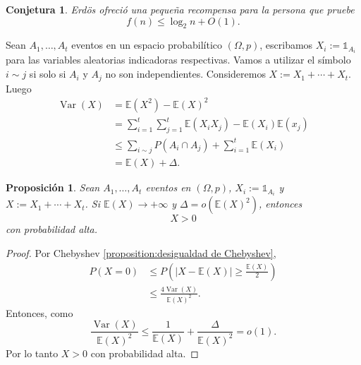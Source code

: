 \documentclass[12pt]{report}
\theoremstyle{plain}
\newtheorem{proposition}[theorem]{Proposición}
\newtheorem{conjecture}[theorem]{Conjetura}
\theoremstyle{definition}
\newcommand{\abs}[1]{\left \vert #1 \right \vert}
\begin{document}
\begin{conjecture}
Erdös ofreció una pequeña recompensa para la persona que pruebe
\[
    f(n) \leq \log_2 n + O(1).
\]
\end{conjecture}



\bigskip

Sean $A_1, \ldots, A_t$ eventos en un espacio probabilítico $(\Omega, p)$, escribamos $X_i := \mathbb{1}_{A_i}$ para las variables aleatorias indicadoras respectivas. Vamos a utilizar el símbolo $i \sim j$ si solo si $A_i$ y $A_j$ no son independientes. Consideremos $X := X_1 + \cdots + X_t$. Luego
\begin{align*}
\operatorname{Var} (X) &= \mathbb{E} (X^2) - \mathbb{E} (X)^2 \\
&= \sum_{i = 1}^t \sum_{j = 1}^t \mathbb{E}(X_i X_j) - \mathbb{E}(X_i) \mathbb{E}(x_j) \\
&\leq \sum_{i \sim j} P(A_i \cap A_j) + \sum_{i = 1}^t \mathbb{E} (X_i) \\
&= \mathbb{E} (X) + \Delta.
\end{align*}

\begin{proposition}
Sean $A_1, \ldots, A_t$ eventos en $(\Omega, p)$, $X_i := \mathbb{1}_{A_i}$ y $X:= X_1 + \cdots + X_t$. Si $\mathbb{E} (X) \longrightarrow + \infty$ y $\Delta = o (\mathbb{E}(X)^2)$, entonces
\[
    X > 0
\]
con probabilidad alta.
\end{proposition}
\begin{proof}
Por Chebyshev \ref{proposition:desigualdad de Chebyshev},
\begin{align*}
P(X = 0) &\leq P(\abs{X - \mathbb{E} (X)} \geq \frac{\mathbb{E} (X)}{2}) \\
&\leq \frac{4 \operatorname{Var}(X)}{\mathbb{E}(X)^2} .
\end{align*}
Entonces, como
\[
    \frac{\operatorname{Var}(X)}{\mathbb{E}(X)^2} \leq \frac{1}{\mathbb{E}(X)} + \frac{\Delta}{\mathbb{E}(X)^2} = o(1).
\]
Por lo tanto $X > 0$ con probabilidad alta.
\end{proof}
\end{document}
